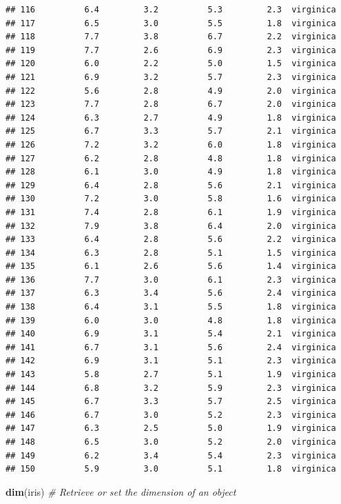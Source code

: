 \documentclass[]{article}
\newenvironment{Shaded}{\begin{snugshade}}{\end{snugshade}}
\newcommand{\CommentTok}[1]{\textcolor[rgb]{0.56,0.35,0.01}{\textit{#1}}}
\newcommand{\KeywordTok}[1]{\textcolor[rgb]{0.13,0.29,0.53}{\textbf{#1}}}
\newcommand{\NormalTok}[1]{#1}
\begin{document}
\begin{verbatim}
## 116          6.4         3.2          5.3         2.3  virginica
## 117          6.5         3.0          5.5         1.8  virginica
## 118          7.7         3.8          6.7         2.2  virginica
## 119          7.7         2.6          6.9         2.3  virginica
## 120          6.0         2.2          5.0         1.5  virginica
## 121          6.9         3.2          5.7         2.3  virginica
## 122          5.6         2.8          4.9         2.0  virginica
## 123          7.7         2.8          6.7         2.0  virginica
## 124          6.3         2.7          4.9         1.8  virginica
## 125          6.7         3.3          5.7         2.1  virginica
## 126          7.2         3.2          6.0         1.8  virginica
## 127          6.2         2.8          4.8         1.8  virginica
## 128          6.1         3.0          4.9         1.8  virginica
## 129          6.4         2.8          5.6         2.1  virginica
## 130          7.2         3.0          5.8         1.6  virginica
## 131          7.4         2.8          6.1         1.9  virginica
## 132          7.9         3.8          6.4         2.0  virginica
## 133          6.4         2.8          5.6         2.2  virginica
## 134          6.3         2.8          5.1         1.5  virginica
## 135          6.1         2.6          5.6         1.4  virginica
## 136          7.7         3.0          6.1         2.3  virginica
## 137          6.3         3.4          5.6         2.4  virginica
## 138          6.4         3.1          5.5         1.8  virginica
## 139          6.0         3.0          4.8         1.8  virginica
## 140          6.9         3.1          5.4         2.1  virginica
## 141          6.7         3.1          5.6         2.4  virginica
## 142          6.9         3.1          5.1         2.3  virginica
## 143          5.8         2.7          5.1         1.9  virginica
## 144          6.8         3.2          5.9         2.3  virginica
## 145          6.7         3.3          5.7         2.5  virginica
## 146          6.7         3.0          5.2         2.3  virginica
## 147          6.3         2.5          5.0         1.9  virginica
## 148          6.5         3.0          5.2         2.0  virginica
## 149          6.2         3.4          5.4         2.3  virginica
## 150          5.9         3.0          5.1         1.8  virginica
\end{verbatim}

\begin{Shaded}
\begin{Highlighting}[]
\KeywordTok{dim}\NormalTok{(iris) }\CommentTok{# Retrieve or set the dimension of an object}
\end{Highlighting}
\end{Shaded}
\end{document}
